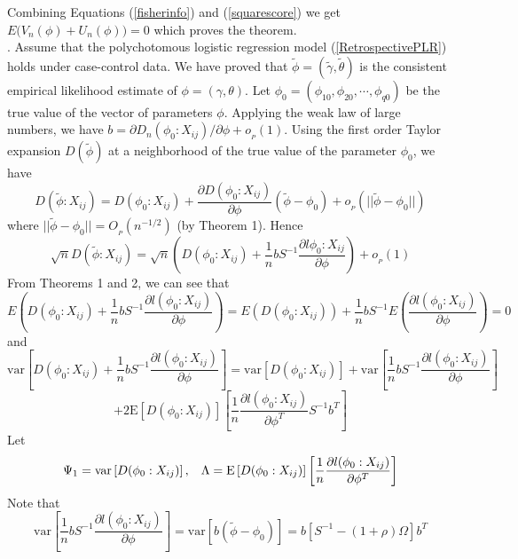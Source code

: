 \documentclass[12]{interact}
\theoremstyle{plain}%
\theoremstyle{definition}
\theoremstyle{remark}
\begin{document}
\noindent Combining Equations (\ref{fisherinfo}) and (\ref{squarescore})
we get $E\Big(V_n(\phi)+U_n(\phi)\Big)=0$ which proves the theorem.\\


. Assume that the polychotomous logistic regression model (\ref{RetrospectivePLR}) holds under case-control data. We have proved that $\tilde{\phi}=(\tilde{\gamma},\tilde{\theta})$ is the
consistent empirical likelihood estimate of $\phi=(\gamma, \theta)$. Let $\phi_0=(\phi_{10}, \phi_{20}, \cdots, \phi_{q0})$ be the true value of the vector of parameters $\phi$. Applying the weak law of large numbers, we have $b =\partial D_n(\phi_0: X_{ij})/\partial \phi + o_{_P}(1)$. Using the first order Taylor expansion $D(\tilde{\phi})$
at a neighborhood of the true value of the parameter $\phi_0$, we have
\begin{equation}
	D(\tilde{\phi}:X_{ij})= D(\phi_0:X_{ij})+\frac{\partial D(\phi_0: X_{ij})}{\partial \phi}(\tilde{\phi}-\phi_0)+o_{_P}(||\tilde{\phi}-\phi_0||)
\end{equation}
\noindent where $||\tilde{\phi}-\phi_0||=O_{_P}(n^{-1/2})$ (by Theorem 1). Hence
\begin{equation}
	\sqrt{n}D(\tilde{\phi}:X_{ij})= \sqrt{n}\left(D(\phi_0:X_{ij})+ \frac{1}{n}bS^{-1}\frac{\partial l{\phi_0: X_{ij}}}{\partial \phi}\right)+o_{_P}(1)
\end{equation}
From Theorems 1 and 2, we can see that
$$
E\left(D(\phi_0:X_{ij})+ \frac{1}{n}bS^{-1}\frac{\partial l(\phi_0: X_{ij})}{\partial \phi}\right)
=E\left(D(\phi_0:X_{ij})\right)+ \frac{1}{n}bS^{-1}E\left(\frac{\partial l(\phi_0: X_{ij})}{\partial \phi}\right) =0
$$
and
$$
\mbox{var}\left[ D(\phi_0:X_{ij})+ \frac{1}{n}bS^{-1}\frac{\partial l(\phi_0: X_{ij})}{\partial \phi}\right]
=\mbox{var} \left[ D(\phi_0:X_{ij})\right] + \mbox{var}\left[ \frac{1}{n}bS^{-1}\frac{\partial l(\phi_0: X_{ij})}{\partial \phi}\right]
$$
\begin{equation}
	+ 2 \mbox{E}\left[ D(\phi_0:X_{ij})\right]\left[\frac{1}{n}\frac{\partial l(\phi_0: X_{ij})}{\partial \phi^T}S^{-1}b^T \right]
\end{equation}
Let
$$
\Psi_1=\mbox{var} \left[ D(\phi_0:X_{ij})\right], \hspace{3mm} \Lambda = \mbox{E}\left[ D(\phi_0:X_{ij})\right]\left[\frac{1}{n}\frac{\partial l(\phi_0: X_{ij})}{\partial \phi^T}\right]
$$
Note that
$$
\mbox{var}\left[ \frac{1}{n}bS^{-1}\frac{\partial l(\phi_0: X_{ij})}{\partial \phi}\right]
=\mbox{var}\left[ b(\tilde{\phi}-\phi_0)\right] = b[S^{-1}-(1+\rho)\Omega]b^T
$$
\end{document}
